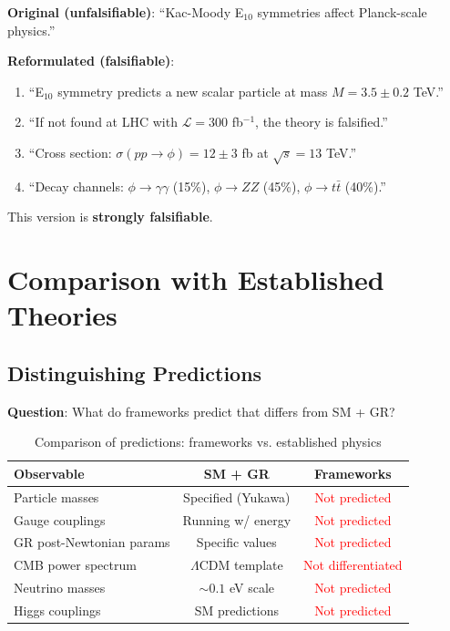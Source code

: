\begin{example}
\textbf{Original (unfalsifiable)}: ``Kac-Moody E$_{10}$ symmetries affect Planck-scale physics.''

\textbf{Reformulated (falsifiable)}:
\begin{enumerate}
    \item ``E$_{10}$ symmetry predicts a new scalar particle at mass $M = 3.5 \pm 0.2$ TeV.''
    \item ``If not found at LHC with $\mathcal{L} = 300$ fb$^{-1}$, the theory is falsified.''
    \item ``Cross section: $\sigma(pp \to \phi) = 12 \pm 3$ fb at $\sqrt{s} = 13$ TeV.''
    \item ``Decay channels: $\phi \to \gamma\gamma$ (15\%), $\phi \to ZZ$ (45\%), $\phi \to t\bar{t}$ (40\%).''
\end{enumerate}

This version is \textbf{strongly falsifiable}.
\end{example}

\section{Comparison with Established Theories}

\subsection{Distinguishing Predictions}

\textbf{Question}: What do frameworks predict that differs from SM + GR?

\begin{table}[H]
\centering
\begin{tabular}{lcc}
\toprule
\textbf{Observable} & \textbf{SM + GR} & \textbf{Frameworks} \\
\midrule
Particle masses & Specified (Yukawa) & \textcolor{red}{Not predicted} \\
Gauge couplings & Running w/ energy & \textcolor{red}{Not predicted} \\
GR post-Newtonian params & Specific values & \textcolor{red}{Not predicted} \\
CMB power spectrum & $\Lambda$CDM template & \textcolor{red}{Not differentiated} \\
Neutrino masses & $\sim 0.1$ eV scale & \textcolor{red}{Not predicted} \\
Higgs couplings & SM predictions & \textcolor{red}{Not predicted} \\
\bottomrule
\end{tabular}
\caption{Comparison of predictions: frameworks vs. established physics}
\end{table}

